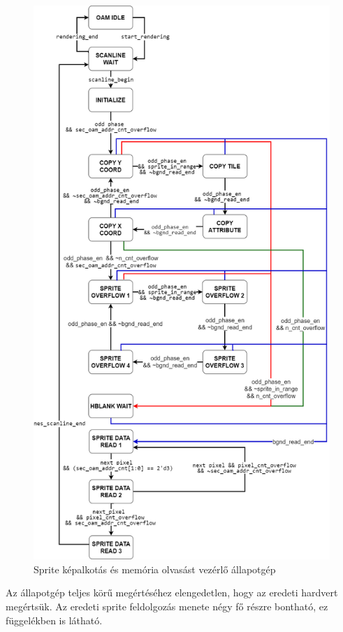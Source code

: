 	\begin{figure}[H]
	\centering
	\includegraphics[width=125mm, keepaspectratio]{figures/sprite-rendering-FSM-v3}
	\caption{Sprite képalkotás és memória olvasást vezérlő állapotgép} 
	\label{fig:sprite-rendering-FSM}
	\end{figure} 

	Az állapotgép teljes körű megértéséhez elengedetlen, hogy az eredeti hardvert megértsük. Az eredeti sprite feldolgozás menete négy fő részre bontható, ez  függelékben is látható. 	
	
